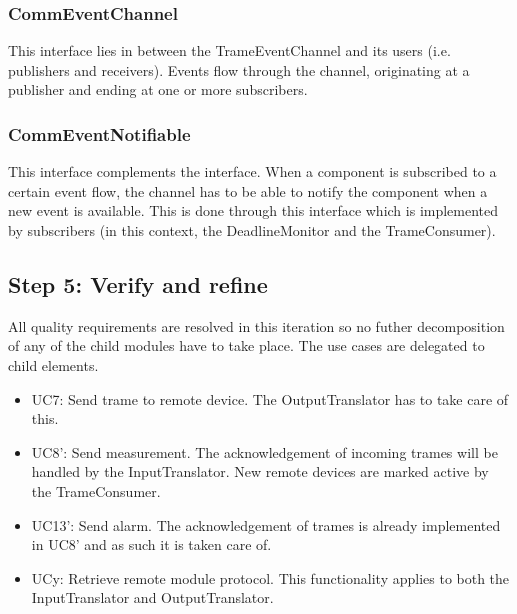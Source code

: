 \subsubsection{CommEventChannel}

\npar This interface lies in between the TrameEventChannel and its users (i.e.
publishers and receivers). Events flow through the channel, originating at a
publisher and ending at one or more subscribers.

\subsubsection{CommEventNotifiable}

\npar This interface complements the  interface.
When a component is subscribed to a certain event flow, the channel has to be able to
notify the component when a new event is available. This is done through this
interface which is implemented by subscribers (in this context, the
DeadlineMonitor and the TrameConsumer).

\subsection{Step 5: Verify and refine}
\label{add:it2/verification}

\npar All quality requirements are resolved in this iteration so no futher
decomposition of any of the child modules have to take place. The use cases
are delegated to child elements. 

\begin{itemize}
	\item UC7: Send trame to remote device. The OutputTranslator has to take care
	of this. 
  	\item UC8': Send measurement. The acknowledgement of incoming trames will
  	be handled by the InputTranslator. New remote devices are marked active by
  	the TrameConsumer. 
  	\item UC13': Send alarm. The acknowledgement of trames is already implemented
  	in UC8' and as such it is taken care of.
  	\item UCy: Retrieve remote module protocol. This functionality applies to
  	both the InputTranslator and OutputTranslator. 
\end{itemize}
